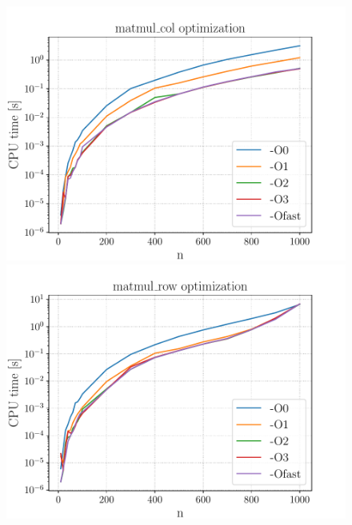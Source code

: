 \documentclass[a4paper]{article}
\begin{document}
\begin{figure}[H]
	\centering
	\begin{minipage}[t]{0.32\linewidth}
		\centering
		\includegraphics[width=1\textwidth]{images/01_ex3_matmul_col_O.pdf}
	\end{minipage}
	\begin{minipage}[t]{0.32\linewidth}
		\centering
		\includegraphics[width=1\textwidth]{images/01_ex3_matmul_row_O.pdf}
	\end{minipage}
	\begin{minipage}[t]{0.32\linewidth}
		\centering

\end{minipage}
\end{figure}
\end{document}
